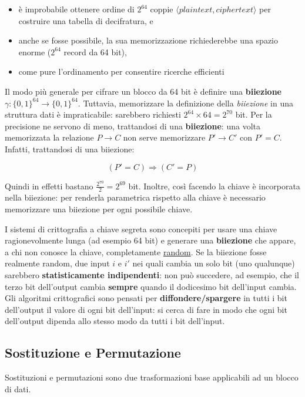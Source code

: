 \begin{itemize}
  \item è improbabile ottenere ordine di $2^{64}$ coppie $\langle plaintext, ciphertext \rangle$ per costruire una tabella di decifratura, e
  \item anche se fosse possibile, la sua memorizzazione richiederebbe una spazio enorme ($2^{64}$ record da 64 bit),
  \item come pure l'ordinamento per consentire ricerche efficienti
\end{itemize}

Il modo più generale per cifrare un blocco da 64 bit è definire una \textbf{biiezione} $\gamma :\{0,1\}^{64} \rightarrow \{0,1\}^{64}$. Tuttavia, memorizzare la definizione della \emph{biiezione} in una struttura dati è impraticabile: sarebbero richiesti $2^{64} \times 64 = 2^{70}$ bit. Per la precisione ne servono di meno, trattandosi di una \textbf{biiezione}: una volta memorizzata la relazione $ P \rightarrow C $ non serve memorizzare $ P' \rightarrow C' $ con $ P' = C $. Infatti, trattandosi di una biiezione:

\[
(P' = C) \Rightarrow (C' = P)
\]

Quindi in effetti bastano $\frac{2^{70}}{2} = 2^{69}$ bit. Inoltre, così facendo la chiave è incorporata nella biiezione: per renderla parametrica rispetto alla chiave è necessario memorizzare una biiezione per ogni possibile chiave.\newline

I sistemi di crittografia a chiave segreta sono concepiti per usare una chiave ragionevolmente lunga (ad esempio 64 bit) e generare una \textbf{biiezione} che appare, a chi non conosce la chiave, completamente \underline{random}. Se la biiezione fosse realmente random, due input $i$ e $i'$ nei quali cambia un solo bit (uno qualunque) sarebbero \textbf{statisticamente indipendenti}: non può succedere, ad esempio, che il terzo bit dell'output cambia \textbf{sempre} quando il dodicesimo bit dell'input cambia. Gli algoritmi crittografici sono pensati per \textbf{diffondere/spargere} in tutti i bit dell'output il valore di ogni bit dell'input: si cerca di fare in modo che ogni bit dell'output dipenda allo stesso modo da tutti i bit dell'input.

\subsection{Sostituzione e Permutazione}
Sostituzioni e permutazioni sono due trasformazioni base applicabili ad un blocco di dati.\newline 

